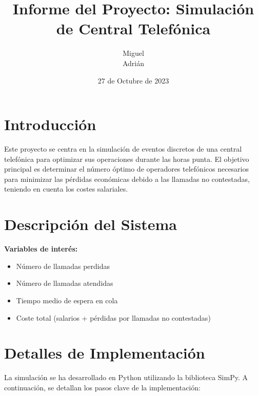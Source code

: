 \documentclass{article}
\title{Informe del Proyecto: Simulación de Central Telefónica}
\author{Miguel \\ Adrián}
\date{27 de Octubre de 2023}
\begin{document}
\maketitle

\section{Introducción}

Este proyecto se centra en la simulación de eventos discretos de una central telefónica para optimizar sus operaciones durante las horas punta. El objetivo principal es determinar el número óptimo de operadores telefónicos necesarios para minimizar las pérdidas económicas debido a las llamadas no contestadas, teniendo en cuenta los costes salariales.

\section{Descripción del Sistema}

\textbf{Variables de interés:}

\begin{itemize}
    \item Número de llamadas perdidas
    \item Número de llamadas atendidas
    \item Tiempo medio de espera en cola
    \item Coste total (salarios + pérdidas por llamadas no contestadas)
\end{itemize}

\section{Detalles de Implementación}

La simulación se ha desarrollado en Python utilizando la biblioteca SimPy. A continuación, se detallan los pasos clave de la implementación:
\end{document}
